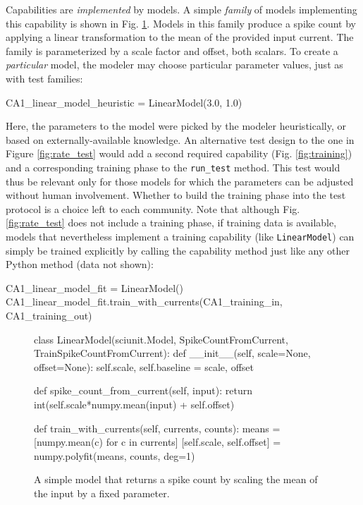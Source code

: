 \documentclass[11pt,letterpaper]{article}
\begin{document}
Capabilities are \emph{implemented} by models. A simple \emph{family} of models implementing this capability is shown in Fig. \ref{fig:simple_model}. Models in this family produce a spike count by applying a linear transformation to the mean of the provided input current. The family is parameterized by a scale factor and offset, both scalars. To create a \emph{particular} model, the modeler may choose particular parameter values, just as with test families:
\begin{python}
CA1_linear_model_heuristic = LinearModel(3.0, 1.0)
\end{python}
Here, the parameters to the model were picked by the modeler heuristically, or based on externally-available knowledge. An alternative test design to the one in Figure \ref{fig:rate_test} would add a second required capability (Fig. \ref{fig:training}) and a corresponding training phase to the \verb|run_test| method. This test would thus be relevant only for those models for which the parameters can be adjusted without human involvement. Whether to build the training phase into the test protocol is a choice left to each community. Note that although Fig. \ref{fig:rate_test} does not include a training phase, if training data is available, models that nevertheless implement a training capability (like \verb|LinearModel|) can simply be trained explicitly by calling the capability method just like any other Python method (data not shown):
\begin{python}
CA1_linear_model_fit = LinearModel()
CA1_linear_model_fit.train_with_currents(CA1_training_in, CA1_training_out)
\end{python}
\begin{figure}
\begin{python}
class LinearModel(sciunit.Model, SpikeCountFromCurrent, 
    TrainSpikeCountFromCurrent):
  def __init__(self, scale=None, offset=None): 
    self.scale, self.baseline = scale, offset
    
  def spike_count_from_current(self, input):
    return int(self.scale*numpy.mean(input) + self.offset)

  def train_with_currents(self, currents, counts):
    means = [numpy.mean(c) for c in currents]
    [self.scale, self.offset] = numpy.polyfit(means, counts, deg=1)    
\end{python}
\caption{A simple model that returns a spike count by scaling the mean of the input by a fixed parameter.}
\label{fig:simple_model}
\end{figure}
\end{document}
